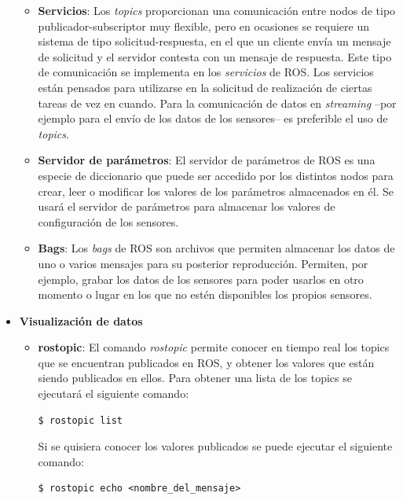\documentclass[12pt, a4paper]{report}
\begin{document}
\begin{itemize}
\begin{itemize}
\item \textbf{Servicios}: Los \textit{topics} proporcionan una comunicación entre nodos de tipo publicador-subscriptor muy flexible, pero en ocasiones se requiere un sistema de tipo solicitud-respuesta, en el que un cliente envía un mensaje de solicitud y el servidor contesta con un mensaje de respuesta. Este tipo de comunicación se implementa en los \textit{servicios} de ROS. Los servicios están pensados para utilizarse en la solicitud de realización de ciertas tareas de vez en cuando. Para la comunicación de datos en \textit{streaming} --por ejemplo para el envío de los datos de los sensores-- es preferible el uso de \textit{topics}.

\item \textbf{Servidor de parámetros}: El servidor de parámetros de ROS es una especie de diccionario que puede ser accedido por los distintos nodos para crear, leer o modificar los valores de los parámetros almacenados en él. Se usará el servidor de parámetros para almacenar los valores de configuración de los sensores.

\item \textbf{Bags}: Los \textit{bags} de ROS son archivos que permiten almacenar los datos de uno o varios mensajes para su posterior reproducción. Permiten, por ejemplo, grabar los datos de los sensores para poder usarlos en otro momento o lugar en los que no estén disponibles los propios sensores.

\end{itemize}

\item \textbf{Visualización de datos}

\begin{itemize}

\item \textbf{rostopic}: El comando \textit{rostopic} permite conocer en tiempo real los topics que se encuentran publicados en ROS, y obtener los valores que están siendo publicados en ellos. Para obtener una lista de los topics se ejecutará el siguiente comando:

\begin{verbatim}
$ rostopic list
\end{verbatim}

Si se quisiera conocer los valores publicados se puede ejecutar el siguiente comando:

\begin{verbatim}
$ rostopic echo <nombre_del_mensaje>
\end{verbatim}


\end{itemize}
\end{itemize}
\end{document}
